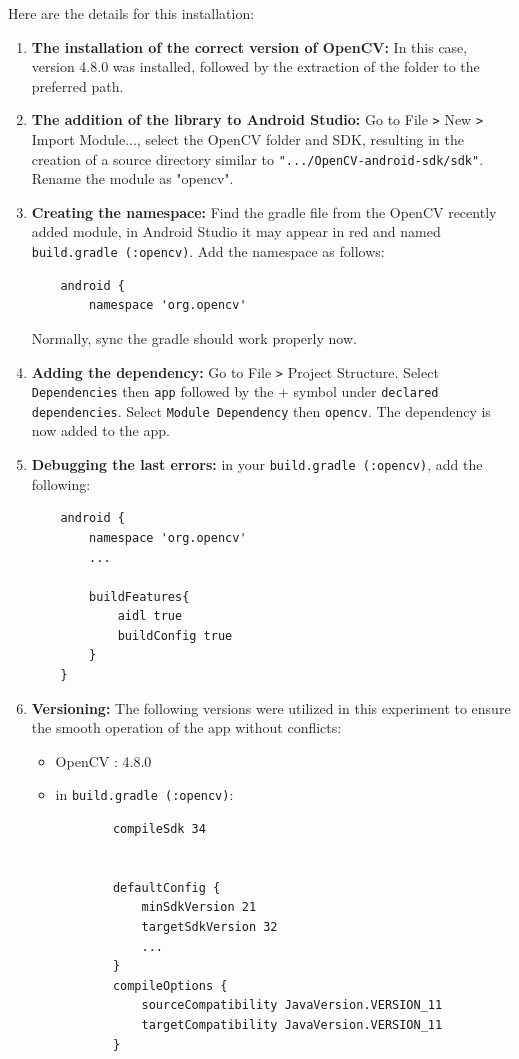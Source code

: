 \documentclass[12pt]{report}
\begin{document}
Here are the details for this installation:
\begin{enumerate}
    \item \textbf{The installation of the correct version of OpenCV:} In this case, version 4.8.0 \cite{bib:opencv} was installed, followed by the extraction of the folder to the preferred path.
    \item \textbf{The addition of the library to Android Studio:} Go to File \verb|>| New \verb|>| Import Module..., select the OpenCV folder and SDK, resulting in the creation of a source directory similar to
    \texttt{".../OpenCV-android-sdk/sdk"}. Rename the module as "opencv". 
    \item \textbf{Creating the namespace:} Find the gradle file from the OpenCV recently added module, in Android Studio it may appear in red and named \texttt{build.gradle (:opencv)}. Add the namespace as follows: 
    \begin{lstlisting}
    android {
        namespace 'org.opencv'
    \end{lstlisting}
    Normally, sync the gradle should work properly now. 
    \item \textbf{Adding the dependency:} Go to File \verb|>| Project Structure. Select \texttt{Dependencies} then \texttt{app} followed by the + symbol under \texttt{declared dependencies}. Select \texttt{Module Dependency} then \texttt{opencv}. The dependency is now added to the app.
    \item \textbf{Debugging the last errors:} in your \texttt{build.gradle (:opencv)}, add the following: 
    \begin{lstlisting}
    android {
        namespace 'org.opencv'
        ...

        buildFeatures{
            aidl true
            buildConfig true
        }
    }
    \end{lstlisting}
    \item \textbf{Versioning: } The following versions were utilized in this experiment to ensure the smooth operation of the app without conflicts:
    \begin{itemize}
        \item OpenCV : 4.8.0
        \item in \texttt{build.gradle (:opencv)}: 
        \begin{lstlisting}
        compileSdk 34


        defaultConfig {
            minSdkVersion 21
            targetSdkVersion 32
            ...
        }
        compileOptions {
            sourceCompatibility JavaVersion.VERSION_11
            targetCompatibility JavaVersion.VERSION_11
        }
        \end{lstlisting}
    

\end{itemize}
\end{enumerate}
\end{document}
